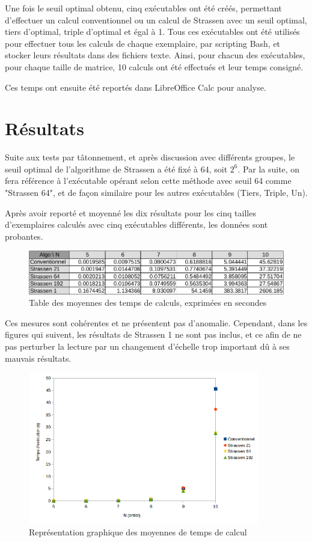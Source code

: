 \documentclass[10pt,a4paper]{article}
\begin{document}
Une fois le seuil optimal obtenu, cinq exécutables ont été créés, permettant d'effectuer un calcul conventionnel ou un calcul de Strassen avec un seuil optimal, tiers d'optimal, triple d'optimal et égal à 1. Tous ces exécutables ont été utilisés pour effectuer tous les calculs de chaque exemplaire, par scripting Bash, et stocker leurs résultats dans des fichiers texte. Ainsi, pour chacun des exécutables, pour chaque taille de matrice, 10 calculs ont été effectués et leur temps consigné.

Ces temps ont ensuite été reportés dans LibreOffice Calc pour analyse.

\section{Résultats}

Suite aux tests par tâtonnement, et après discussion avec différents groupes, le seuil optimal de l'algorithme de Strassen a été fixé à 64, soit $ 2^{6} $. Par la suite, on fera référence à l'exécutable opérant selon cette méthode avec seuil 64 comme "Strassen 64", et de façon similaire pour les autres exécutables (Tiers, Triple, Un).

Après avoir reporté et moyenné les dix résultats pour les cinq tailles d'exemplaires calculés avec cinq exécutables différents, les données sont probantes.

\begin{figure}[h!]
	\includegraphics[width=\textwidth]{spreadsheet/times}
	\caption{Table des moyennes des temps de calculs, exprimées en secondes}
\end{figure}

Ces mesures sont cohérentes et ne présentent pas d'anomalie. Cependant, dans les figures qui suivent, les résultats de Strassen 1 ne sont pas inclus, et ce afin de ne pas perturber la lecture par un changement d'échelle trop important dû à ses mauvais résultats.

\begin{figure}[h!]
	\centering
	\includegraphics[width=0.9\textwidth]{spreadsheet/graph1}
	\caption{Représentation graphique des moyennes de temps de calcul}
\end{figure}
\end{document}
